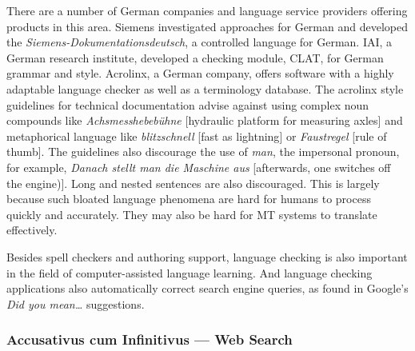 \documentclass[]{../metanetpaper}
\begin{document}
\begin{Parallel}[c]{80mm}{80mm}
{    There are a number of German companies and language service providers offering products in this area. Siemens investigated approaches for German and developed the \textit{Siemens-Dokumentationsdeutsch}, a controlled language for German. IAI, a German research institute, developed a checking module, CLAT, for German grammar and style. Acrolinx, a German company, offers software with a highly adaptable language checker as well as a terminology database. The acrolinx style guidelines for technical documentation advise against using complex noun compounds like \textit{Achsmesshebebühne} {[}hydraulic platform for measuring axles{]} and metaphorical language like \textit{blitzschnell} {[}fast as lightning{]} or \textit{Faustregel} {[}rule of thumb{]}. The guidelines also discourage the use of \textit{man}, the impersonal pronoun, for example, \textit{Danach stellt man die Maschine aus} {[}afterwards, one switches off the engine){]}. Long and nested sentences are also discouraged. This is largely because such bloated language phenomena are hard for humans to process quickly and accurately. They may also be hard for MT systems to translate effectively.

    Besides spell checkers and authoring support, language checking is also important in the field of computer-assisted language learning. And language checking applications also automatically correct search engine queries, as found in Google's \textit{Did you mean…} suggestions.
  }
  \ParallelPar


  \subsubsection{Accusativus cum Infinitivus --- Web Search}

\end{Parallel}
\end{document}
